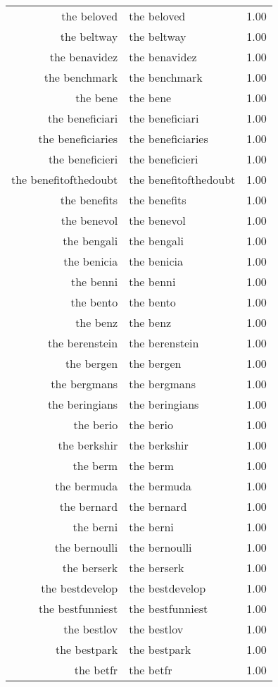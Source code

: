 \begin{table}[ht]
\begin{tabular}{rlr}
  the beloved & the beloved & 1.00 \\ 
  the beltway & the beltway & 1.00 \\ 
  the benavidez & the benavidez & 1.00 \\ 
  the benchmark & the benchmark & 1.00 \\ 
  the bene & the bene & 1.00 \\ 
  the beneficiari & the beneficiari & 1.00 \\ 
  the beneficiaries & the beneficiaries & 1.00 \\ 
  the beneficieri & the beneficieri & 1.00 \\ 
  the benefitofthedoubt & the benefitofthedoubt & 1.00 \\ 
  the benefits & the benefits & 1.00 \\ 
  the benevol & the benevol & 1.00 \\ 
  the bengali & the bengali & 1.00 \\ 
  the benicia & the benicia & 1.00 \\ 
  the benni & the benni & 1.00 \\ 
  the bento & the bento & 1.00 \\ 
  the benz & the benz & 1.00 \\ 
  the berenstein & the berenstein & 1.00 \\ 
  the bergen & the bergen & 1.00 \\ 
  the bergmans & the bergmans & 1.00 \\ 
  the beringians & the beringians & 1.00 \\ 
  the berio & the berio & 1.00 \\ 
  the berkshir & the berkshir & 1.00 \\ 
  the berm & the berm & 1.00 \\ 
  the bermuda & the bermuda & 1.00 \\ 
  the bernard & the bernard & 1.00 \\ 
  the berni & the berni & 1.00 \\ 
  the bernoulli & the bernoulli & 1.00 \\ 
  the berserk & the berserk & 1.00 \\ 
  the bestdevelop & the bestdevelop & 1.00 \\ 
  the bestfunniest & the bestfunniest & 1.00 \\ 
  the bestlov & the bestlov & 1.00 \\ 
  the bestpark & the bestpark & 1.00 \\ 
  the betfr & the betfr & 1.00 \\ 

\end{tabular}
\end{table}
